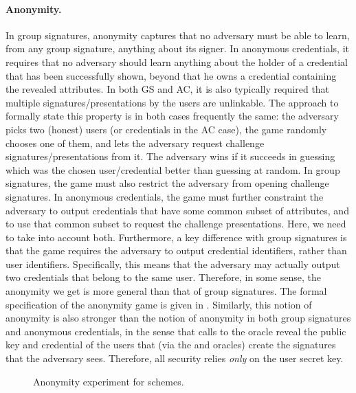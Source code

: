 \paragraph{Anonymity.} %
In group signatures, anonymity captures that no adversary must be able to learn,
from any group signature, anything about its signer. In anonymous credentials,
it requires that no adversary should learn anything about the holder of a
credential that has been successfully shown, beyond that he owns a credential
containing the revealed attributes. In both GS and AC, it is also typically
required that
multiple signatures/presentations by the users are unlinkable. The approach to
formally state this property is in both cases frequently the same: the adversary
picks two (honest) users (or credentials in the AC case), the game randomly
chooses one of them, and lets the adversary request challenge
signatures/presentations from it. The adversary wins if it succeeds in guessing
which was the chosen user/credential better than guessing at random. In group
signatures, the game must also restrict the adversary from opening challenge
signatures. In anonymous credentials, the game must further constraint the
adversary to output credentials that have some common subset of attributes, and
to use that common subset to request the challenge presentations. Here, we need
to take into account both. Furthermore, a key difference with group signatures
is that the game requires the adversary to output credential identifiers, rather
than user identifiers. Specifically, this means that the adversary may actually
output two credentials that belong to the same user. Therefore, in some sense,
the anonymity we get is more general than that of group signatures. The formal
specification of the anonymity game is given in .
%
Similarly, this notion of anonymity is also stronger than the notion of
anonymity in both group signatures and anonymous credentials, in the sense
that calls to the \OPEN oracle reveal the public key and credential of the users
that (via the \SIGN and \CHALb oracles) create the signatures that the adversary
sees. Therefore, all security relies \emph{only} on the user secret key.

\begin{figure}[htp!]
  \caption{Anonymity experiment for \GSAC schemes.}
  \label{fig:exp-gsac-anonb}
\end{figure}

